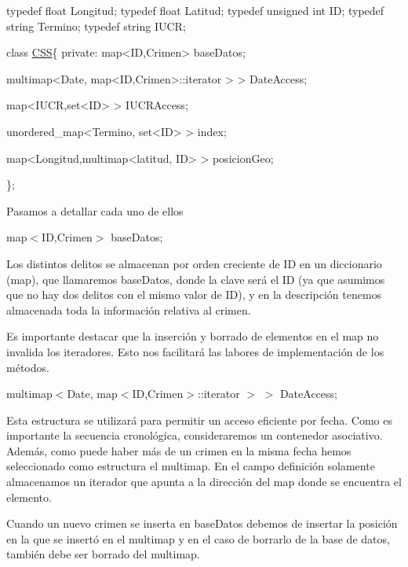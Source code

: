 \begin{DoxyCode}
\textcolor{keyword}{typedef} \textcolor{keywordtype}{float} Longitud;
\textcolor{keyword}{typedef} \textcolor{keywordtype}{float} Latitud;
\textcolor{keyword}{typedef} \textcolor{keywordtype}{unsigned} \textcolor{keywordtype}{int} ID;
\textcolor{keyword}{typedef} \textcolor{keywordtype}{string} Termino;
\textcolor{keyword}{typedef} \textcolor{keywordtype}{string} IUCR;

\textcolor{keyword}{class }\hyperlink{classCSS}{CSS}\{
\textcolor{keyword}{private}:
    map<ID,Crimen> baseDatos; 

    multimap<Date, map<ID,Crimen>::iterator > > DateAccess;

    map<IUCR,set<ID> > IUCRAccess;

    unordered\_map<Termino, set<ID> > index;
    
    map<Longitud,multimap<latitud, ID> > posicionGeo;

\};
\end{DoxyCode}


Pasamos a detallar cada uno de ellos

\begin{DoxyItemize}
\item map$<$\+I\+D,\+Crimen$>$ base\+Datos;\end{DoxyItemize}
Los distintos delitos se almacenan por orden creciente de I\+D en un diccionario (map), que llamaremos base\+Datos, donde la clave será el I\+D (ya que asumimos que no hay dos delitos con el mismo valor de I\+D), y en la descripción tenemos almacenada toda la información relativa al crimen.

Es importante destacar que la inserción y borrado de elementos en el map no invalida los iteradores. Esto nos facilitará las labores de implementación de los métodos.

\begin{DoxyItemize}
\item multimap$<$Date, map$<$\+I\+D,\+Crimen$>$\+::iterator $>$ $>$ Date\+Access;\end{DoxyItemize}
Esta estructura se utilizará para permitir un acceso eficiente por fecha. Como es importante la secuencia cronológica, consideraremos un contenedor asociativo. Además, como puede haber más de un crimen en la misma fecha hemos seleccionado como estructura el multimap. En el campo definición solamente almacenamos un iterador que apunta a la dirección del map donde se encuentra el elemento.

Cuando un nuevo crimen se inserta en base\+Datos debemos de insertar la posición en la que se insertó en el multimap y en el caso de borrarlo de la base de datos, también debe ser borrado del multimap.

